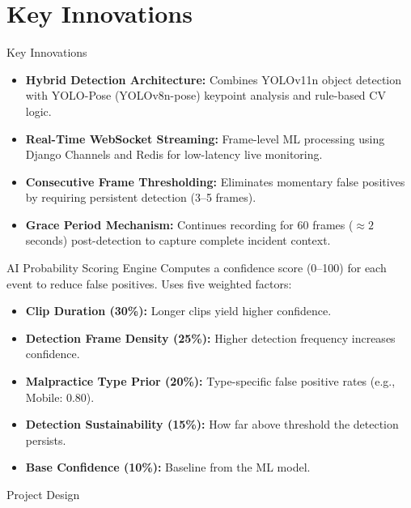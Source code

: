 \documentclass{beamer}
\begin{document}
\section{Key Innovations}
\begin{frame}{Key Innovations}
\begin{itemize}
    \item \textbf{Hybrid Detection Architecture:} Combines YOLOv11n object detection with YOLO-Pose (YOLOv8n-pose) keypoint analysis and rule-based CV logic.
    \item \textbf{Real-Time WebSocket Streaming:} Frame-level ML processing using Django Channels and Redis for low-latency live monitoring.
    \item \textbf{Consecutive Frame Thresholding:} Eliminates momentary false positives by requiring persistent detection (3--5 frames).
    \item \textbf{Grace Period Mechanism:} Continues recording for 60 frames ($\approx 2$ seconds) post-detection to capture complete incident context.
\end{itemize}
\end{frame}

\begin{frame}{AI Probability Scoring Engine}
Computes a confidence score (0--100) for each event to reduce false positives. Uses five weighted factors:
\begin{itemize}
    \item \textbf{Clip Duration (30\%):} Longer clips yield higher confidence.
    \item \textbf{Detection Frame Density (25\%):} Higher detection frequency increases confidence.
    \item \textbf{Malpractice Type Prior (20\%):} Type-specific false positive rates (e.g., Mobile: 0.80).
    \item \textbf{Detection Sustainability (15\%):} How far above threshold the detection persists.
    \item \textbf{Base Confidence (10\%):} Baseline from the ML model.
\end{itemize}
\end{frame}

\begin{frame}{}
    \centering
    \Huge Project Design
\end{frame}
\end{document}
